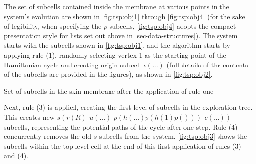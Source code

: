 The set of subcells contained inside the membrane at various points in the system's evolution are shown in \autoref{fig:tsp:obj1} through \autoref{fig:tsp:obj4} (for the sake of legibility, when specifying the \(p\) subcells, \autoref{fig:tsp:obj4} adopts the compact presentation style for lists set out above in \autoref{sec-data-structures}).  The system starts with the subcells shown in \autoref{fig:tsp:obj1}, and the algorithm starts by applying rule (1), randomly selecting vertex 1 as the starting point of the Hamiltonian cycle and creating origin subcell \(s(...)\) (full details of the contents of the subcells are provided in the figures), as shown in \autoref{fig:tsp:obj2}.


\begin{cpobjectsfloat}
\begin{cpobjects}
\end{cpobjects}
\caption{\label{fig:tsp:obj2}Set of subcells in the skin membrane after the application of rule one}
\end{cpobjectsfloat}

Next, rule (3) is applied, creating the first level of subcells in the exploration tree.  This creates new \(s(r(R) ~ \,u(...) ~ \,p(h(...)p(h(1)p())) ~ \,c(...))\) subcells, representing the potential paths of the cycle after one step.  Rule (4) concurrently removes the old \(s\) subcells from the system.  \autoref{fig:tsp:obj3} shows the subcells within the top-level cell at the end of this first application of rules (3) and (4).


